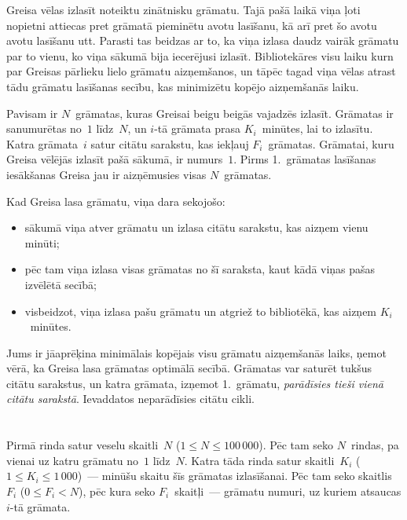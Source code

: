 \ifx\boi\undefined\fi
\def\version{jury-1}

Greisa vēlas izlasīt noteiktu zinātnisku grāmatu.
Tajā pašā laikā viņa ļoti nopietni attiecas pret grāmatā pieminētu avotu lasīšanu,
kā arī pret šo avotu avotu lasīšanu utt.
Parasti tas beidzas ar to, ka viņa izlasa daudz vairāk grāmatu par to vienu, ko
viņa sākumā bija iecerējusi izlasīt.
Bibliotekāres visu laiku kurn par Greisas pārlieku lielo grāmatu aizņemšanos,
un tāpēc tagad viņa vēlas atrast tādu grāmatu lasīšanas secību, kas minimizētu
kopējo aizņemšanās laiku.

Pavisam ir $N$~grāmatas, kuras Greisai beigu beigās vajadzēs izlasīt.
Grāmatas ir sanumurētas no~$1$ līdz~$N$, un $i$-tā grāmata prasa $K_i$~minūtes, lai
to izlasītu.
Katra grāmata~$i$ satur citātu sarakstu, kas iekļauj $F_i$~grāmatas.
Grāmatai, kuru Greisa vēlējās izlasīt pašā sākumā, ir numurs~$1$. %
Pirms 1.~grāmatas lasīšanas iesākšanas Greisa jau ir aizņēmusies visas $N$~grāmatas.

Kad Greisa lasa grāmatu, viņa dara sekojošo:
\begin{itemize}
\item sākumā viņa atver grāmatu un izlasa citātu sarakstu, kas aizņem vienu minūti;
\item pēc tam viņa izlasa visas grāmatas no šī saraksta, kaut kādā viņas pašas izvēlētā secībā;
\item visbeidzot, viņa izlasa pašu grāmatu un atgriež to bibliotēkā, kas aizņem $K_i$~minūtes.
\end{itemize}

Jums ir jāaprēķina minimālais kopējais visu grāmatu aizņemšanās laiks, ņemot vērā, ka Greisa
lasa grāmatas optimālā secībā.
Grāmatas var saturēt tukšus citātu sarakstus, un katra grāmata, izņemot 1.~grāmatu, {\em
parādīsies tieši vienā citātu sarakstā}.
Ievaddatos neparādīsies citātu cikli.

\section*{}
Pirmā rinda satur veselu skaitli~$N$ ($1 \le N \le 100\,000$).
Pēc tam seko $N$~rindas, pa vienai uz katru grāmatu no~$1$ līdz~$N$.
Katra tāda rinda satur skaitli~$K_i$ ($1 \le K_i \le 1\,000$)~--- minūšu skaitu šīs grāmatas izlasīšanai.
Pēc tam seko skaitlis~$F_i$ ($0 \le F_i < N$), pēc kura seko $F_i$~skaitļi~--- grāmatu numuri, uz kuriem atsaucas $i$-tā grāmata.

